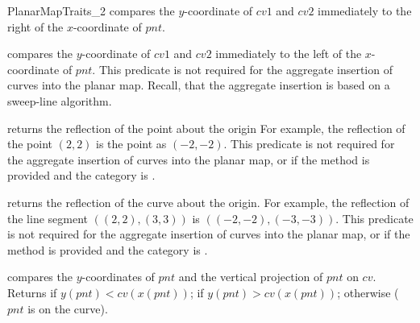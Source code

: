 \begin{ccRefConcept}{PlanarMapTraits_2}
         {compares the $y$-coordinate of $cv1$ and $cv2$ immediately to the
	   right of the $x$-coordinate of $pnt$.
           }
    
         {compares the $y$-coordinate of $cv1$ and $cv2$ immediately to the
           left of the $x$-coordinate of $pnt$. This predicate is not
	   required for the aggregate insertion of curves into the planar map.
	   Recall, that the aggregate insertion is based on a sweep-line
	   algorithm.
           }
    
         {returns the reflection of the point  about the origin
	   For example, the reflection of the point $(2,2)$ is the point as
	   $(-2,-2)$. This predicate is not required for the aggregate
	   insertion of curves into the planar map, or if the method
	    is provided and
	   the  category is .}
	   
         {returns the reflection of the curve  about the origin.
          For example, the reflection of the line segment $((2,2),(3,3))$
	  is $((-2,-2),(-3,-3))$. This predicate is not required for the
	  aggregate insertion of curves into the planar map, or if the method
	   is provided and the
	   category is .}

         {compares the $y$-coordinates of $pnt$ and the vertical projection of
	   $pnt$ on $cv$. Returns  if $y(pnt) < cv(x(pnt))$;
	    if $y(pnt) > cv(x(pnt))$;
	    otherwise ($pnt$ is on the curve).
           }


\end{ccRefConcept}
